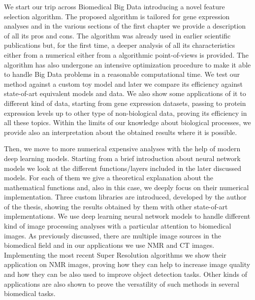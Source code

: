 \documentclass{standalone}
\begin{document}
We start our trip across Biomedical Big Data introducing a novel feature selection algorithm.
The proposed algorithm is tailored for gene expression analyses and in the various sections of the first chapter we provide a description of all its pros and cons.
The algorithm was already used in earlier scientific publications but, for the first time, a deeper analysis of all its characteristics either from a numerical either from a algorithmic point-of-views is provided.
The algorithm has also undergone an intensive optimization procedure to make it able to handle Big Data problems in a reasonable computational time.
We test our method against a custom toy model and later we compare its efficiency against state-of-art equivalent models and data.
We also show some applications of it to different kind of data, starting from gene expression datasets, passing to protein expression levels up to other type of non-biological data, proving its efficiency in all these topics.
Within the limits of our knowledge about biological processes, we provide also an interpretation about the obtained results where it is possible.

Then, we move to more numerical expensive analyses with the help of modern deep learning models.
Starting from a brief introduction about neural network models we look at the different functions/layers included in the later discussed models.
For each of them we give a theoretical explanation about the mathematical functions and, also in this case, we deeply focus on their numerical implementation.
Three custom libraries are introduced, developed by the author of the thesis, showing the results obtained by them with other state-of-art implementations.
We use deep learning neural network models to handle different kind of image processing analyses with a particular attention to biomedical images.
As previously discussed, there are multiple image sources in the biomedical field and in our applications we use NMR and CT images.
Implementing the most recent Super Resolution algorithms we show their application on NMR images, proving how they can help to increase image quality and how they can be also used to improve object detection tasks.
Other kinds of applications are also shown to prove the versatility of such methods in several biomedical tasks.
\end{document}
